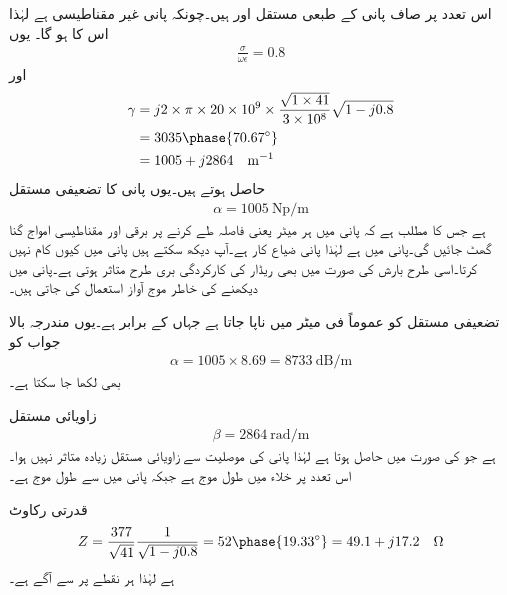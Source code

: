اس تعدد پر صاف پانی کے طبعی مستقل  اور  ہیں۔چونکہ پانی غیر مقناطیسی ہے لہٰذا اس کا  ہو گا۔ یوں
\begin{align*}
\frac{\sigma}{\omega \epsilon}=0.8
\end{align*}
اور
\begin{align*}
\gamma&=j 2\times \pi \times 20\times 10^9 \times \frac{\sqrt{1\times 41}}{3\times 10^8} \sqrt{1-j 0.8}\\
&=3035 \phase{70.67^{\circ}}\\
&=1005+j2864 \quad \si{\meter^{-1}}
\end{align*}
حاصل ہوتے ہیں۔یوں پانی کا تضعیفی مستقل
\begin{align*}
\alpha=\SI{1005}{\neper \per \meter}
\end{align*}
ہے جس کا مطلب ہے کہ پانی میں ہر  میٹر یعنی  فاصلہ طے  کرنے پر برقی اور مقناطیسی امواج  گنا گھٹ جائیں گی۔پانی میں  ہے لہٰذا پانی ضیاع کار ہے۔آپ دیکھ سکتے ہیں  پانی میں کیوں کام نہیں کرتا۔اسی طرح بارش کی صورت میں بھی ریڈار کی کارکردگی بری طرح متاثر ہوتی ہے۔پانی میں دیکھنے کی خاطر موج آواز استعمال کی جاتی ہیں۔

تضعیفی مستقل کو عموماً  فی میٹر میں ناپا جاتا ہے جہاں  کے برابر ہے۔یوں مندرجہ بالا جواب کو
\begin{align*}
\alpha=1005\times 8.69=\SI{8733}{\deci\bel\per\meter}
\end{align*}
بھی لکھا جا سکتا ہے۔

زاویائی مستقل
\begin{align*}
\beta=\SI{2864}{\radian \per \meter}
\end{align*}
ہے جو  کی صورت میں  حاصل ہوتا ہے لہٰذا پانی کی موصلیت سے زاویائی مستقل زیادہ متاثر نہیں ہوا۔ اس تعدد پر خلاء میں طول موج  ہے جبکہ پانی میں  سے طول موج  ہے۔

قدرتی رکاوٹ
\begin{align*}
Z=\frac{377}{\sqrt{41}}\frac{1}{\sqrt{1-j 0.8}}=52\phase{19.33^\circ}=49.1+j17.2 \quad \si{\ohm}
\end{align*}
ہے لہٰذا  ہر نقطے پر  سے  آگے ہے۔


